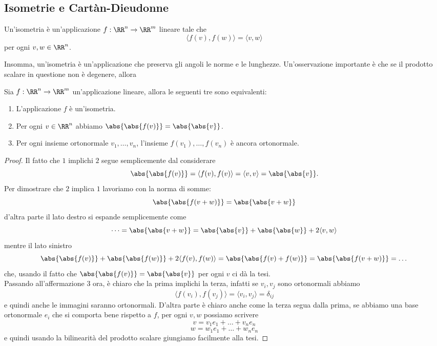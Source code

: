 \documentclass[11pt]{scrartcl}
\begin{document}
   	 \subsection{Isometrie e Cartàn-Dieudonne}
   	 
   	 \begin{definition}[Isometria]
   	 	Un'isometria è un'applicazione $f:\RR^n\to\RR^m$ lineare tale che
   	 	$$\langle f(v),f(w)\rangle=\langle v,w\rangle $$
   	 	per ogni $v,w\in \RR^n$.
   	 \end{definition}
   	 Insomma, un'isometria è un'applicazione che preserva gli angoli le norme e le lunghezze. Un'osservazione importante è che se il prodotto scalare in questione non è degenere, allora
   	 \begin{lemma}
   	 	Sia $f:\RR^n\to\RR^m$ un'applicazione lineare, allora le seguenti tre sono equivalenti:
   	 	\begin{enumerate}
   	 		\item L'applicazione $f$ è un'isometria.
   	 		\item Per ogni $v\in \RR^n$ abbiamo $\abs{\abs{f(v)}}=\abs{\abs{v}}$.
   	 		\item Per ogni insieme ortonormale $v_1,\dots,v_n$, l'insieme $f(v_1),\dots,f(v_n)$ è ancora ortonormale.
   	 	\end{enumerate} 
   	 \end{lemma}
   	 \begin{proof}
   	 	Il fatto che $1$ implichi $2$ segue semplicemente dal considerare 
   	 	$$\abs{\abs{f(v)}}=\langle f(v),f(v)\rangle = \langle v,v \rangle=\abs{\abs{v}}.$$
   	 	Per dimostrare che $2$ implica $1$ lavoriamo con la norma di somme:
   	 	$$\abs{\abs{f(v+w)}}=\abs{\abs{v+w}}$$
   	 	d'altra parte il lato destro si espande semplicemente come
   	 	$$\dots=\abs{\abs{v+w}}=\abs{\abs{v}}+\abs{\abs{w}}+2\langle v,w\rangle$$
   	 	mentre il lato sinistro 
   	 	$$\abs{\abs{f(v)}}+\abs{\abs{f(w)}}+2\langle f(v),f(w)\rangle=\abs{\abs{f(v)+f(w)}}=\abs{\abs{f(v+w)}}=\dots$$
   	 	che, usando il fatto che $\abs{\abs{f(v)}}=\abs{\abs{v}}$ per ogni $v$ ci dà la tesi. \\
   	 	Passando all'affermazione $3$ ora, è chiaro che la prima implichi la terza, infatti se $v_i,v_j$ sono ortonormali abbiamo
   	 	$$\langle f(v_i),f(v_j) \rangle = \langle v_i,v_j \rangle =\delta_{ij}$$
   	 	e quindi anche le immagini saranno ortonormali. D'altra parte è chiaro anche come la terza segua dalla prima, se abbiamo una base ortonormale $e_i$ che si comporta bene rispetto a $f$, per ogni $v,w$ possiamo scrivere
   	 	$$v=v_1e_1+\dots+v_ne_n$$
   	 	$$w=w_1e_1+\dots+w_ne_n$$
   	 	e quindi usando la bilinearità del prodotto scalare giungiamo facilmente alla tesi.
   	 \end{proof}
\end{document}
